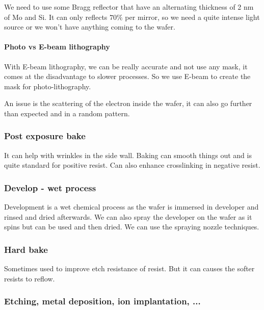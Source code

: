 \documentclass[
]{article}
\begin{document}
We need to use some Bragg reflector that have an alternating thickness
of 2 nm of Mo and Si. It can only reflects \(70\%\) per mirror, so we
need a quite intense light source or we won't have anything coming to
the wafer.

\hypertarget{photo-vs-e-beam-lithography}{%
\paragraph{Photo vs E-beam
lithography}\label{photo-vs-e-beam-lithography}}

With E-beam lithography, we can be really accurate and not use any mask,
it comes at the disadvantage to slower processes. So we use E-beam to
create the mask for photo-lithography.

An issue is the scattering of the electron inside the wafer, it can also
go further than expected and in a random pattern.

\hypertarget{post-exposure-bake}{%
\subsubsection{Post exposure bake}\label{post-exposure-bake}}

It can help with wrinkles in the side wall. Baking can smooth things out
and is quite standard for positive resist. Can also enhance crosslinking
in negative resist.

\hypertarget{develop---wet-process}{%
\subsubsection{Develop - wet process}\label{develop---wet-process}}

Development is a wet chemical process as the wafer is immersed in
developer and rinsed and dried afterwards. We can also spray the
developer on the wafer as it spins but can be used and then dried. We
can use the spraying nozzle techniques.

\hypertarget{hard-bake}{%
\subsubsection{Hard bake}\label{hard-bake}}

Sometimes used to improve etch resistance of resist. But it can causes
the softer resists to reflow.

\hypertarget{etching-metal-deposition-ion-implantation-...}{%
\subsubsection{Etching, metal deposition, ion implantation,
...}\label{etching-metal-deposition-ion-implantation-...}}
\end{document}
